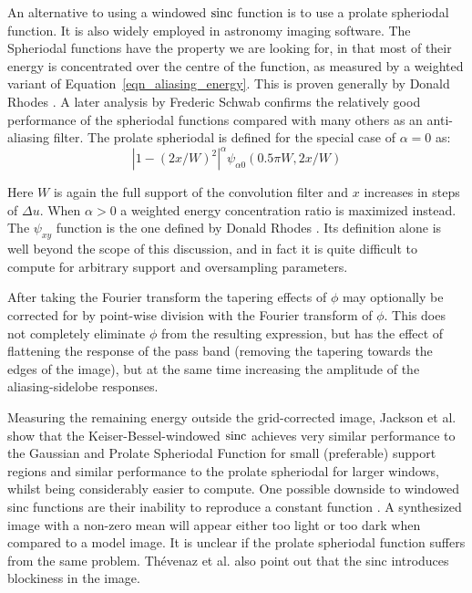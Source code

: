  An alternative to using a windowed $\operatorname*{sinc}$ function is to use a prolate spheriodal function. It is also widely employed in 
 astronomy imaging software. The Spheriodal functions have the property we are looking for, in that most of their energy is concentrated 
 over the centre of the function, as measured by a weighted variant of Equation~\ref{eqn_aliasing_energy}. This is proven generally by 
 Donald Rhodes \cite{rhodes1970spheroidal}. A later analysis by Frederic Schwab \cite{schwab1984optimal} confirms the relatively good 
 performance of the spheriodal functions compared with many others as an anti-aliasing filter. The prolate spheriodal is defined
 for the special case of $\alpha=0$ as:
 \begin{equation}
  |1-(2x/W)^2|^\alpha\psi_{\alpha0}(0.5\pi W,2x/W)
 \end{equation}
 
 Here $W$ is again the full support of the convolution filter and $x$ increases in steps of $\Delta{u}$. When $\alpha>0$ a 
 weighted energy concentration ratio is maximized instead. The $\psi_{xy}$ function is the one defined by Donald Rhodes \cite{rhodes1970spheroidal}.
 Its definition alone is well beyond the scope of this discussion, and in fact it is quite difficult to compute for arbitrary support and
 oversampling parameters.
 
 After taking the Fourier transform the tapering effects of $\phi$ may optionally be corrected for by point-wise division with the Fourier transform of
 $\phi$. This does not completely eliminate $\phi$ from the resulting expression, but has the effect of flattening the response of the pass band (removing the
 tapering towards the edges of the image), but at the same time increasing the amplitude of the aliasing-sidelobe responses.
 
 Measuring the remaining energy outside the grid-corrected image, Jackson et al.\cite{jackson1991selection} show that the Keiser-Bessel-windowed $\operatorname*{sinc}$ achieves 
 very similar performance to the Gaussian and Prolate Spheriodal Function for small (preferable) support regions and similar performance to the 
 prolate spheriodal for larger windows, whilst being considerably easier to compute. One possible downside to windowed sinc functions
 are their inability to reproduce a constant function \cite{thevenaz2000image}. A synthesized image with a non-zero 
 mean will appear either too light or too dark when compared to a model image. It is unclear if the prolate spheriodal function suffers from the same
 problem. Th\'evenaz et al. also point out that the sinc introduces blockiness in the image.
 
